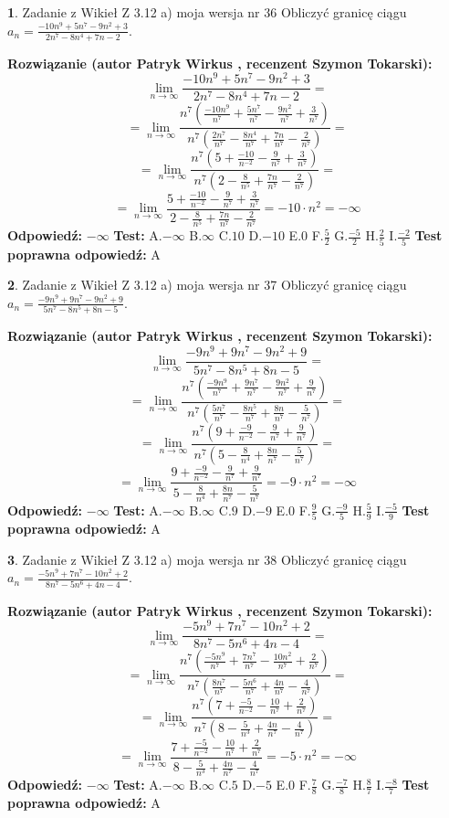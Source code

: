 \documentclass[12pt, a4paper]{article}
\theoremstyle{definition} %
\newtheorem{zad}{}
\newcommand{\zadStart}[1]{\begin{zad}#1\newline}
\newcommand{\zadStop}{\end{zad}}
\newcommand{\rozwStart}[2]{\noindent \textbf{Rozwiązanie (autor #1 , recenzent #2): }\newline}
\newcommand{\rozwStop}{\newline}
\newcommand{\odpStart}{\noindent \textbf{Odpowiedź:}\newline}
\newcommand{\odpStop}{\newline}
\newcommand{\testStart}{\noindent \textbf{Test:}\newline}
\newcommand{\testStop}{\newline}
\newcommand{\kluczStart}{\noindent \textbf{Test poprawna odpowiedź:}\newline}
\newcommand{\kluczStop}{\newline}
\begin{document}
\zadStart{Zadanie z Wikieł Z 3.12 a) moja wersja nr 36}
Obliczyć granicę ciągu $a_{n}=\frac{-10n^{9}+5n^{7}-9n^{2}+3}{2n^{7}-8n^{4}+7n-2}$.
\zadStop
\rozwStart{Patryk Wirkus}{Szymon Tokarski}
$$\lim\limits_{n\to\infty}\frac{-10n^{9}+5n^{7}-9n^{2}+3}{2n^{7}-8n^{4}+7n-2}=$$
$$=\lim\limits_{n\to\infty}\frac{n^{7}\left(\frac{-10n^{9}}{n^{7}}+\frac{5n^{7}}{n^{7}}-\frac{9n^{2}}{n^{7}}+\frac{3}{n^{7}}\right)}{n^{7}\left(\frac{2n^{7}}{n^{7}}-\frac{8n^{4}}{n^{7}}+\frac{7n}{n^{7}}-\frac{2}{n^{7}}\right)}=$$
$$=\lim\limits_{n\to\infty}\frac{n^{7}\left(5+\frac{-10}{n^{-2}}-\frac{9}{n^{7}}+\frac{3}{n^{7}}\right)}
{n^{7}\left(2-\frac{8}{n^{5}}+\frac{7n}{n^{7}}-\frac{2}{n^{7}}\right)}=$$
$$=\lim\limits_{n\to\infty}\frac{5+\frac{-10}{n^{-2}}-\frac{9}{n^{7}}+\frac{3}{n^{7}}}{2-\frac{8}{n^{5}}+\frac{7n}{n^{7}}-\frac{2}{n^{7}}}=-10\cdot n^{2} = -\infty$$
\rozwStop
\odpStart
$-\infty$
\odpStop
\testStart
A.$-\infty$
B.$\infty$
C.$10$
D.$-10$
E.$0$
F.$\frac{5}{2}$
G.$\frac{-5}{2}$
H.$\frac{2}{5}$
I.$\frac{-2}{5}$
\testStop
\kluczStart
A
\kluczStop



\zadStart{Zadanie z Wikieł Z 3.12 a) moja wersja nr 37}
Obliczyć granicę ciągu $a_{n}=\frac{-9n^{9}+9n^{7}-9n^{2}+9}{5n^{7}-8n^{5}+8n-5}$.
\zadStop
\rozwStart{Patryk Wirkus}{Szymon Tokarski}
$$\lim\limits_{n\to\infty}\frac{-9n^{9}+9n^{7}-9n^{2}+9}{5n^{7}-8n^{5}+8n-5}=$$
$$=\lim\limits_{n\to\infty}\frac{n^{7}\left(\frac{-9n^{9}}{n^{7}}+\frac{9n^{7}}{n^{7}}-\frac{9n^{2}}{n^{7}}+\frac{9}{n^{7}}\right)}{n^{7}\left(\frac{5n^{7}}{n^{7}}-\frac{8n^{5}}{n^{7}}+\frac{8n}{n^{7}}-\frac{5}{n^{7}}\right)}=$$
$$=\lim\limits_{n\to\infty}\frac{n^{7}\left(9+\frac{-9}{n^{-2}}-\frac{9}{n^{7}}+\frac{9}{n^{7}}\right)}
{n^{7}\left(5-\frac{8}{n^{4}}+\frac{8n}{n^{7}}-\frac{5}{n^{7}}\right)}=$$
$$=\lim\limits_{n\to\infty}\frac{9+\frac{-9}{n^{-2}}-\frac{9}{n^{7}}+\frac{9}{n^{7}}}{5-\frac{8}{n^{4}}+\frac{8n}{n^{7}}-\frac{5}{n^{7}}}=-9\cdot n^{2} = -\infty$$
\rozwStop
\odpStart
$-\infty$
\odpStop
\testStart
A.$-\infty$
B.$\infty$
C.$9$
D.$-9$
E.$0$
F.$\frac{9}{5}$
G.$\frac{-9}{5}$
H.$\frac{5}{9}$
I.$\frac{-5}{9}$
\testStop
\kluczStart
A
\kluczStop



\zadStart{Zadanie z Wikieł Z 3.12 a) moja wersja nr 38}
Obliczyć granicę ciągu $a_{n}=\frac{-5n^{9}+7n^{7}-10n^{2}+2}{8n^{7}-5n^{6}+4n-4}$.
\zadStop
\rozwStart{Patryk Wirkus}{Szymon Tokarski}
$$\lim\limits_{n\to\infty}\frac{-5n^{9}+7n^{7}-10n^{2}+2}{8n^{7}-5n^{6}+4n-4}=$$
$$=\lim\limits_{n\to\infty}\frac{n^{7}\left(\frac{-5n^{9}}{n^{7}}+\frac{7n^{7}}{n^{7}}-\frac{10n^{2}}{n^{7}}+\frac{2}{n^{7}}\right)}{n^{7}\left(\frac{8n^{7}}{n^{7}}-\frac{5n^{6}}{n^{7}}+\frac{4n}{n^{7}}-\frac{4}{n^{7}}\right)}=$$
$$=\lim\limits_{n\to\infty}\frac{n^{7}\left(7+\frac{-5}{n^{-2}}-\frac{10}{n^{7}}+\frac{2}{n^{7}}\right)}
{n^{7}\left(8-\frac{5}{n^{3}}+\frac{4n}{n^{7}}-\frac{4}{n^{7}}\right)}=$$
$$=\lim\limits_{n\to\infty}\frac{7+\frac{-5}{n^{-2}}-\frac{10}{n^{7}}+\frac{2}{n^{7}}}{8-\frac{5}{n^{3}}+\frac{4n}{n^{7}}-\frac{4}{n^{7}}}=-5\cdot n^{2} = -\infty$$
\rozwStop
\odpStart
$-\infty$
\odpStop
\testStart
A.$-\infty$
B.$\infty$
C.$5$
D.$-5$
E.$0$
F.$\frac{7}{8}$
G.$\frac{-7}{8}$
H.$\frac{8}{7}$
I.$\frac{-8}{7}$
\testStop
\kluczStart
A
\kluczStop
\end{document}
